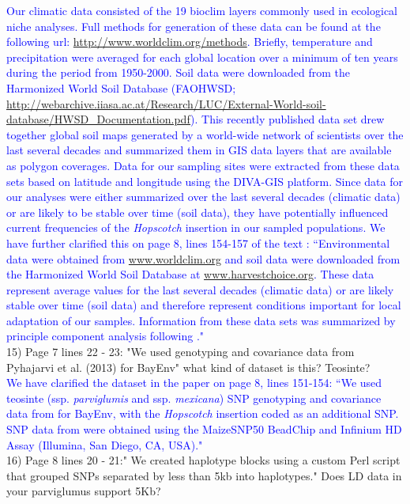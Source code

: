 \documentclass[11pt]{article}
\newcommand{\res}[1]{\noindent \textcolor{blue}{{#1}} \\}
\begin{document}
\res{Our climatic data consisted of the 19 bioclim layers commonly used in ecological niche analyses. Full methods for generation of these data can be found at the following url: \url{http://www.worldclim.org/methods}. Briefly, temperature and precipitation were averaged for each global location over a minimum of ten years during the period from 1950-2000.  Soil data were downloaded from the Harmonized World Soil Database (FAOHWSD; \url{http://webarchive.iiasa.ac.at/Research/LUC/External-World-soil-database/HWSD_Documentation.pdf}). This recently published data set drew together global soil maps generated by a world-wide network of scientists over the last several decades and summarized them in GIS data layers that are available as polygon coverages. Data for our sampling sites were extracted from these data sets based on latitude and longitude using the DIVA-GIS platform. Since data for our analyses were either summarized over the last several decades (climatic data) or are likely to be stable over time (soil data), they have potentially influenced current frequencies of the \emph{Hopscotch} insertion in our sampled populations. We have further clarified this on page 8, lines 154-157 of the text : ``Environmental data were obtained from \url{www.worldclim.org} and soil data were downloaded from the Harmonized World Soil Database \citep{FAOHWSD} at \url{www.harvestchoice.org}.  These data represent average values for the last several decades (climatic data) or are likely stable over time (soil data) and therefore represent conditions important for local adaptation of our samples.  Information from these data sets was summarized by principle component analysis following \citet{Pyhajarvi2013}."} 

15) Page 7 lines 22 - 23: "We used genotyping and covariance data from Pyhajarvi et al. (2013) for BayEnv" what kind of dataset is this? Teosinte?\\ 

\res{We have clarified the dataset in the paper on page 8, lines 151-154: ``We used teosinte (ssp. \emph{parviglumis} and ssp. \emph{mexicana}) SNP genotyping and covariance data from \citet{Pyhajarvi2013} for BayEnv, with the \emph{Hopscotch} insertion coded as an additional SNP. SNP data from \citet{Pyhajarvi2013} were obtained using the MaizeSNP50 BeadChip and Infinium HD Assay (Illumina, San Diego, CA, USA)."}

16) Page 8 lines 20 - 21:" We created haplotype blocks using a custom Perl script that grouped SNPs separated by less than 5kb into haplotypes." Does LD data in your parviglumus support 5Kb?\\ 
\end{document}
